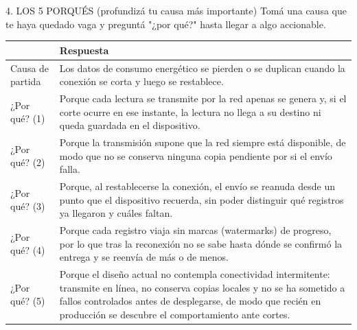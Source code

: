 \documentclass[11pt,a4paper]{article}
\newcommand{\tblhead}{\rowcolor{gris800}}
\begin{document}
\begin{seccion}{\faQuestionCircle}{4. LOS 5 PORQUÉS (profundizá tu causa más importante)}
{\small Tomá una causa que te haya quedado vaga y preguntá "¿por qué?" hasta llegar a algo accionable.}
\vspace{4pt}
\renewcommand{\arraystretch}{1.35}
\begin{tabularx}{\linewidth}{>{\raggedright\arraybackslash}p{3.2cm} X}
  \toprule
  \tblhead {\color{white}\bfseries Pregunta} & {\color{white}\bfseries Respuesta} \\
  \midrule
  Causa de partida & Los datos de consumo energético se pierden o se duplican cuando la conexión se corta y luego se restablece. \\
  ¿Por qué? (1) & Porque cada lectura se transmite por la red apenas se genera y, si el corte ocurre en ese instante, la lectura no llega a su destino ni queda guardada en el dispositivo. \\
  ¿Por qué? (2) & Porque la transmisión supone que la red siempre está disponible, de modo que no se conserva ninguna copia pendiente por si el envío falla. \\
  ¿Por qué? (3) & Porque, al restablecerse la conexión, el envío se reanuda desde un punto que el dispositivo recuerda, sin poder distinguir qué registros ya llegaron y cuáles faltan. \\
  ¿Por qué? (4) & Porque cada registro viaja sin marcas (watermarks) de progreso, por lo que tras la reconexión no se sabe hasta dónde se confirmó la entrega y se reenvía de más o de menos. \\
  ¿Por qué? (5) & Porque el diseño actual no contempla conectividad intermitente: transmite en línea, no conserva copias locales y no se ha sometido a fallos controlados antes de desplegarse, de modo que recién en producción se descubre el comportamiento ante cortes. \\
  \bottomrule
\end{tabularx}
\end{seccion}
\end{document}
